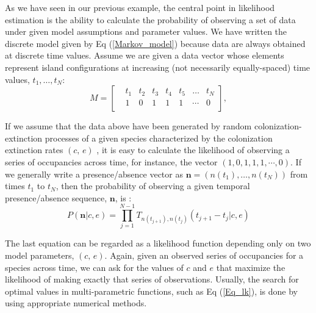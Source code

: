 As we have seen in our previous example, the central point in likelihood estimation is the ability to calculate the probability of observing a set of data under given model assumptions and parameter values. We have written the discrete model given by Eq (\ref{Markov_model}) because data are always obtained at discrete time values. Assume we are given a data vector whose elements represent island configurations at increasing (not necessarily equally-spaced) time values, $t_1, \dots, t_N$:
\begin{equation}
	\label{eq:data}
	M = 
	\left[
	\begin{array}{rccccccc}
	& t_1 & t_2 & t_3 & t_4  & t_5 & \dots & t_N                             \\
	& 1 & 0 & 1 & 1 & 1 & \cdots & 0                                   \\
	\end{array}
	\right],
\end{equation}
\smallskip

If we assume that the data above have been generated by random colonization-extinction processes of a given species characterized by the colonization extinction rates $(c,\, e)$ , it is easy to calculate the likelihood of observing a series of occupancies across time, for instance, the vector $(1, 0, 1, 1, 1, \cdots, 0)$. If we generally write a presence/absence vector as ${\boldsymbol n}=(n(t_1),\dots,n(t_N))$ from times $t_{1}$ to $t_N$, then the probability of observing a given temporal presence/absence sequence, ${\boldsymbol n}$, is \citep{Alonso2015}:
\begin{equation}
P( {\boldsymbol n} | c, e) = \prod_{j=1}^{N-1}T_{n(t_{j+1}),n(t_j)}(t_{j+1}-t_{j}| c,e) 
\label{Eq_lk}
\end{equation}

The last equation can be regarded as a likelihood function depending only on two model parameters, $(c,\,e)$. Again, given an observed series of occupancies for a species across time, we can ask for the values of $c$ and $e$ that maximize the likelihood of making exactly that series of observations. Usually, the search for optimal values in multi-parametric functions, such as Eq (\ref{Eq_lk}), is done by using appropriate numerical methods.
\smallskip

